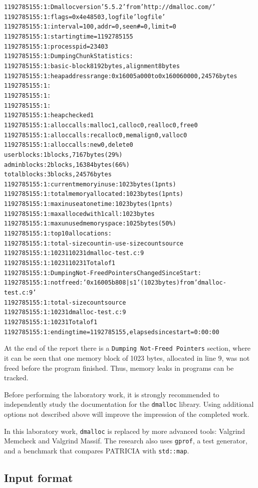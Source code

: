 {\scriptsize
\begin{alltt}
1192785155: 1: Dmalloc version '5.5.2' from 'http://dmalloc.com/'
1192785155: 1: flags = 0x4e48503, logfile 'logfile'
1192785155: 1: interval = 100, addr = 0, seen # = 0, limit = 0
1192785155: 1: starting time = 1192785155
1192785155: 1: process pid = 23403
1192785155: 1: Dumping Chunk Statistics:
1192785155: 1: basic-block 8192 bytes, alignment 8 bytes
1192785155: 1: heap address range: 0x16005a000 to 0x160060000, 24576 bytes
1192785155: 1:
1192785155: 1:
1192785155: 1:
1192785155: 1: heap checked 1
1192785155: 1: alloc calls: malloc 1, calloc 0, realloc 0, free 0
1192785155: 1: alloc calls: recalloc 0, memalign 0, valloc 0
1192785155: 1: alloc calls: new 0, delete 0
 user blocks: 1 blocks, 7167 bytes (29\%)
admin blocks: 2 blocks, 16384 bytes (66\%)
total blocks: 3 blocks, 24576 bytes
1192785155: 1:   current memory in use: 1023 bytes (1 pnts)
1192785155: 1:  total memory allocated: 1023 bytes (1 pnts)
1192785155: 1:  max in use at one time: 1023 bytes (1 pnts)
1192785155: 1: max alloced with 1 call: 1023 bytes
1192785155: 1: max unused memory space: 1025 bytes (50\%)
1192785155: 1: top 10 allocations:
1192785155: 1: total-size count in-use-size count source
1192785155: 1: 1023 1 1023 1 dmalloc-test.c:9
1192785155: 1: 1023 1 1023 1 Total of 1
1192785155: 1: Dumping Not-Freed Pointers Changed Since Start:
1192785155: 1: not freed: '0x16005b808|s1' (1023 bytes) from 'dmalloc-test.c:9'
1192785155: 1: total-size count source
1192785155: 1: 1023 1 dmalloc-test.c:9
1192785155: 1: 1023 1 Total of 1
1192785155: 1: ending time = 1192785155, elapsed since start = 0:00:00
\end{alltt}
}

At the end of the report there is a \texttt{Dumping Not-Freed Pointers} section, where it can be
seen that one memory block of 1023 bytes, allocated in line 9, was not freed before the program
finished. Thus, memory leaks in programs can be tracked.

Before performing the laboratory work, it is strongly recommended to independently study the
documentation for the \texttt{dmalloc} library. Using additional options not described above will
improve the impression of the completed work.

In this laboratory work, \texttt{dmalloc} is replaced by more advanced tools: Valgrind Memcheck and
Valgrind Massif. The research also uses \texttt{gprof}, a test generator, and a benchmark that
compares PATRICIA with \texttt{std::map}.

\subsection*{Input format}

